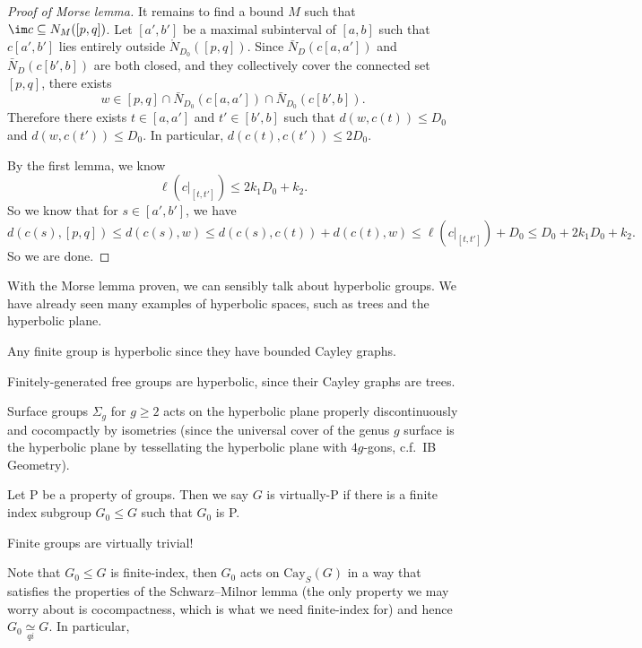 \documentclass[a4paper]{article}
\newcommand\Cay{\mathrm{Cay}}
\newcommand{\qi}{\underset{qi}{\simeq}}
\begin{document}
\begin{proof}[Proof of Morse lemma]
  It remains to find a bound $M$ such that $\im c \subseteq N_M([p, q])$. Let $[a', b']$ be a maximal subinterval of $[a, b]$ such that $c[a', b']$ lies entirely outside $\mathring{N}_{D_0}([p, q])$. Since $\bar{N}_D(c[a, a'])$ and $\bar{N}_D(c[b', b])$ are both closed, and they collectively cover the connected set $[p, q]$, there exists
  \[
    w \in [p, q] \cap \bar{N}_{D_0}(c[a, a']) \cap \bar{N}_{D_0}(c[b', b]).
  \]
  Therefore there exists $t \in [a, a']$ and $t' \in [b', b]$ such that $d(w, c(t)) \leq D_0$ and $d(w, c(t')) \leq D_0$. In particular, $d(c(t), c(t')) \leq 2 D_0$.

  By the first lemma, we know
  \[
    \ell(c|_{[t, t']}) \leq 2k_1 D_0 + k_2.
  \]
  So we know that for $s \in [a', b']$, we have
  \[
    d(c(s), [p, q]) \leq d(c(s), w) \leq d(c(s), c(t)) + d(c(t), w) \leq \ell(c|_{[t, t']}) + D_0 \leq D_0 + 2k_1 D_0 + k_2.
  \]
  So we are done.
\end{proof}

With the Morse lemma proven, we can sensibly talk about hyperbolic groups. We have already seen many examples of hyperbolic spaces, such as trees and the hyperbolic plane.

\begin{eg}
  Any finite group is hyperbolic since they have bounded Cayley graphs.
\end{eg}

\begin{eg}
  Finitely-generated free groups are hyperbolic, since their Cayley graphs are trees.
\end{eg}

\begin{eg}
  Surface groups $\Sigma_g$ for $g \geq 2$ acts on the hyperbolic plane properly discontinuously and cocompactly by isometries (since the universal cover of the genus $g$ surface is the hyperbolic plane by tessellating the hyperbolic plane with $4g$-gons, c.f.\ IB Geometry).
\end{eg}

\begin{defi}[virtually-P]
  Let P be a property of groups. Then we say $G$ is virtually-P if there is a finite index subgroup $G_0 \leq G$ such that $G_0$ is P.
\end{defi}

\begin{eg}
  Finite groups are virtually trivial!
\end{eg}

Note that $G_0 \leq G$ is finite-index, then $G_0$ acts on $\Cay_S(G)$ in a way that satisfies the properties of the Schwarz--Milnor lemma (the only property we may worry about is cocompactness, which is what we need finite-index for) and hence $G_0 \qi G$. In particular,
\end{document}
